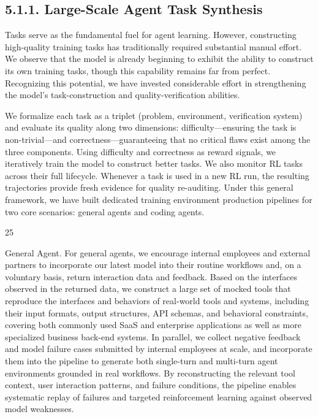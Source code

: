 \documentclass[
  10
]{article}
\begin{document}
\subsection{5.1.1. Large-Scale Agent Task
Synthesis}\label{large-scale-agent-task-synthesis}

Tasks serve as the fundamental fuel for agent learning. However,
constructing high-quality training tasks has traditionally required
substantial manual effort. We observe that the model is already
beginning to exhibit the ability to construct its own training tasks,
though this capability remains far from perfect. Recognizing this
potential, we have invested considerable effort in strengthening the
model's task-construction and quality-verification abilities.

We formalize each task as a triplet (problem, environment, verification
system) and evaluate its quality along two dimensions:
difficulty---ensuring the task is non-trivial---and
correctness---guaranteeing that no critical flaws exist among the three
components. Using difficulty and correctness as reward signals, we
iteratively train the model to construct better tasks. We also monitor
RL tasks across their full lifecycle. Whenever a task is used in a new
RL run, the resulting trajectories provide fresh evidence for quality
re-auditing. Under this general framework, we have built dedicated
training environment production pipelines for two core scenarios:
general agents and coding agents.

25

General Agent. For general agents, we encourage internal employees and
external partners to incorporate our latest model into their routine
workflows and, on a voluntary basis, return interaction data and
feedback. Based on the interfaces observed in the returned data, we
construct a large set of mocked tools that reproduce the interfaces and
behaviors of real-world tools and systems, including their input
formats, output structures, API schemas, and behavioral constraints,
covering both commonly used SaaS and enterprise applications as well as
more specialized business back-end systems. In parallel, we collect
negative feedback and model failure cases submitted by internal
employees at scale, and incorporate them into the pipeline to generate
both single-turn and multi-turn agent environments grounded in real
workflows. By reconstructing the relevant tool context, user interaction
patterns, and failure conditions, the pipeline enables systematic replay
of failures and targeted reinforcement learning against observed model
weaknesses.
\end{document}
